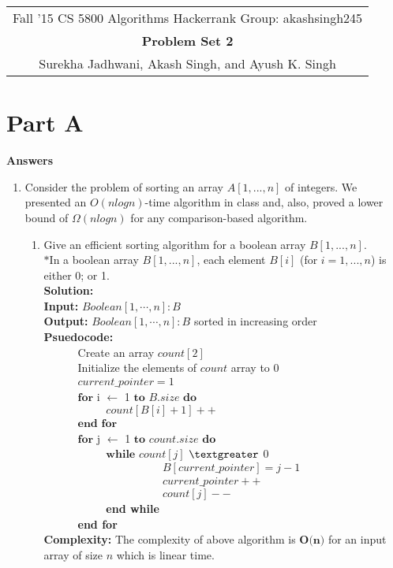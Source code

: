 \documentclass[12pt]{article}
\begin{document}
\begin{center}
\begin{tabular}{|c|}
\hline
Fall '15 CS 5800 Algorithms \hspace{5cm} Hackerrank Group: akashsingh245\\
{\bfseries \large Problem Set 2}\\
Surekha Jadhwani, Akash Singh, and Ayush K. Singh\\
\hline
\end{tabular}
\end{center}

\section{Part A}
\textbf{\large{Answers}}
\begin{enumerate}
\item Consider the problem of sorting an array $A[1,...,n]$ of integers. We presented an $O(nlogn)$-time algorithm in class and, also, proved a lower bound of $\Omega(nlogn)$ for any comparison-based algorithm.
\begin{enumerate}
\item Give an efficient sorting algorithm for a boolean array $B[1, ..., n]$.\\
$*$In a boolean array $B[1, ..., n]$, each element $B[i]$ (for $i = 1, ..., n$) is either 0; or 1.\\
\textbf{Solution:} \\
\textbf{Input:} $Boolean[1, \cdots, n]: B$\\ 
\textbf{Output:} $Boolean[1, \cdots, n]: B$ sorted in increasing order \\
\textbf{Psuedocode:}\\
\verb|		|Create an array $count[2]$\\
\verb|		|Initialize the elements of $count$ array to 0\\
\verb|		|$current\_pointer = 1$\\
\verb|		|$\textbf{for}$ i $\leftarrow$ 1 $\textbf{to}$ $B.size$ $\textbf{do}$ \\
\verb|		|\verb|		|$count[B[i]+1]++$ \\
\verb|		|$\textbf{end for}$\\
\verb|		|$\textbf{for}$ j $\leftarrow$ 1 $\textbf{to}$ $count.size$ $\textbf{do}$\\
\verb|		|\verb|		|$\textbf{while}$ $count[j]$ $\textgreater$ 0\\
\verb|		|\verb|		|\verb|		|\verb|		|$B[current\_pointer] = j-1$\\
\verb|		|\verb|		|\verb|		|\verb|		|$current\_pointer++$\\
\verb|		|\verb|		|\verb|		|\verb|		|$count[j]--$\\
\verb|		|\verb|		|\textbf{end while}\\
\verb|		|\textbf{end for}\\
\textbf{Complexity:} The complexity of above algorithm is $\textbf{O(n)}$ for an input array of size $n$ which is linear time.\\


\end{enumerate}
\end{enumerate}
\end{document}
